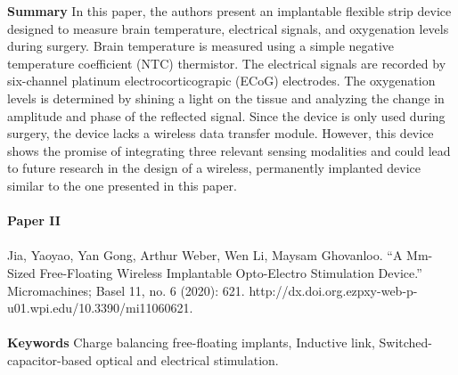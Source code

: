 \noindent
\textbf{Summary} In this paper, the authors present an implantable flexible strip device designed to measure brain temperature, electrical signals, and oxygenation levels during surgery. Brain temperature is measured using a simple negative temperature coefficient (NTC) thermistor. The electrical signals are recorded by six-channel platinum electrocorticograpic (ECoG) electrodes. The oxygenation levels is determined by shining a light on the tissue and analyzing the change in amplitude and phase of the reflected signal. Since the device is only used during surgery, the device lacks a wireless data transfer module. However, this device shows the promise of integrating three relevant sensing modalities and could lead to future research in the design of a wireless, permanently implanted device similar to the one presented in this paper. \\ \\


\textbf{Paper II} 
\\ \\
\noindent
Jia, Yaoyao, Yan Gong, Arthur Weber, Wen Li, Maysam Ghovanloo. “A Mm-Sized Free-Floating Wireless Implantable Opto-Electro Stimulation Device.” Micromachines; Basel 11, no. 6 (2020): 621. http://dx.doi.org.ezpxy-web-p-u01.wpi.edu/10.3390/mi11060621. \\ \\

\noindent
\textbf{Keywords} Charge balancing free-floating implants, Inductive link, Switched-capacitor-based optical and electrical stimulation.  \\ \\

